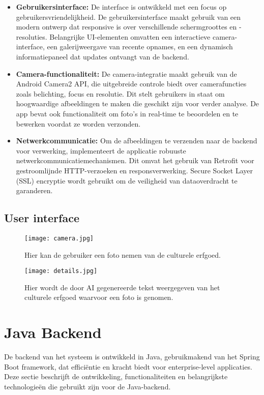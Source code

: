 \begin{itemize}
    \item \textbf{Gebruikersinterface:} De interface is ontwikkeld met een focus op gebruikersvriendelijkheid. De gebruikersinterface maakt gebruik van een modern ontwerp dat responsive is over verschillende schermgroottes en -resoluties. Belangrijke UI-elementen omvatten een interactieve camera-interface, een galerijweergave van recente opnames, en een dynamisch informatiepaneel dat updates ontvangt van de backend.
    
    \item \textbf{Camera-functionaliteit:} De camera-integratie maakt gebruik van de Android Camera2 API, die uitgebreide controle biedt over camerafuncties zoals belichting, focus en resolutie. Dit stelt gebruikers in staat om hoogwaardige afbeeldingen te maken die geschikt zijn voor verder analyse. De app bevat ook functionaliteit om foto's in real-time te beoordelen en te bewerken voordat ze worden verzonden.
    
    \item \textbf{Netwerkcommunicatie:} Om de afbeeldingen te verzenden naar de backend voor verwerking, implementeert de applicatie robuuste netwerkcommunicatiemechanismen. Dit omvat het gebruik van Retrofit voor gestroomlijnde HTTP-verzoeken en responsverwerking. Secure Socket Layer (SSL) encryptie wordt gebruikt om de veiligheid van dataoverdracht te garanderen.
    
\end{itemize}

\subsection{User interface}

\begin{figure}[h!]
    \centering
    \texttt{[image: camera.jpg]}
    \captionsetup{justification=centering}
    \caption{Hier kan de gebruiker een foto nemen van de culturele erfgoed.}
    \label{fig:FrontEndCamera}
\end{figure}
\begin{figure}[h!]
    \centering
    \texttt{[image: details.jpg]}
    \captionsetup{justification=centering}
    \caption{Hier wordt de door AI gegenereerde tekst weergegeven van het culturele erfgoed waarvoor een foto is genomen.}
    \label{fig:FrontEndCameraDetails}
\end{figure}
\pagebreak
\section{Java Backend}
De backend van het systeem is ontwikkeld in Java, gebruikmakend van het Spring Boot framework, dat efficiëntie en kracht biedt voor enterprise-level applicaties. Deze sectie beschrijft de ontwikkeling, functionaliteiten en belangrijkste technologieën die gebruikt zijn voor de Java-backend.

